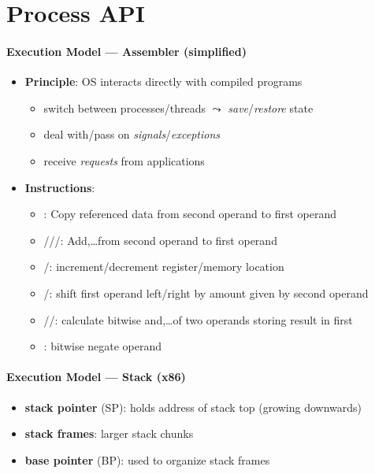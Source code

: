 \section{Process API}

\paragraph{Execution Model --- Assembler (simplified)}
\begin{itemize}
  \item \textbf{Principle}: OS interacts directly with compiled programs
  \begin{itemize}
    \item switch between processes/threads \( \leadsto \) \emph{save}/\emph{restore} state
    \item deal with/pass on \emph{signals}/\emph{exceptions}
    \item receive \emph{requests} from applications
  \end{itemize}
  \item \textbf{Instructions}:
  \begin{itemize}
    \item {}: Copy referenced data from second operand to first operand
    \item {}///: Add,\dots from second operand to first operand
    \item {}/: increment/decrement register/memory location
    \item {}/: shift first operand left/right by amount given by second operand
    \item {}//: calculate bitwise and,\dots of two operands storing result in first
    \item {}: bitwise negate operand
  \end{itemize}
\end{itemize}

\paragraph{Execution Model --- Stack (x86)}
\begin{itemize}
  \item \textbf{stack pointer} (SP): holds address of stack top (growing downwards)
  \item \textbf{stack frames}: larger stack chunks
  \item \textbf{base pointer} (BP): used to organize stack frames
\end{itemize}


